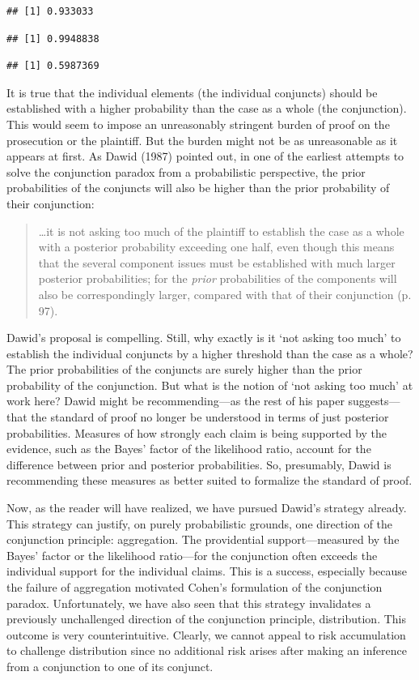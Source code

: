 \documentclass[
  10pt,
  dvipsnames,enabledeprecatedfontcommands]{scrartcl}
\begin{document}
\begin{verbatim}
## [1] 0.933033
\end{verbatim}

\begin{verbatim}
## [1] 0.9948838
\end{verbatim}

\begin{verbatim}
## [1] 0.5987369
\end{verbatim}

It is true that the individual elements (the individual conjuncts)
should be established with a higher probability than the case as a whole
(the conjunction). This would seem to impose an unreasonably stringent
burden of proof on the prosecution or the plaintiff. But the burden
might not be as unreasonable as it appears at first. As Dawid (1987)
pointed out, in one of the earliest attempts to solve the conjunction
paradox from a probabilistic perspective, the prior probabilities of the
conjuncts will also be higher than the prior probability of their
conjunction:

\begin{quote}
\dots it is not asking too much of the plaintiff to establish the case as a whole with a posterior probability exceeding one half, even though this means  that the several component issues must be established with much larger posterior probabilities; for the \textit{prior}  probabilities of the components will also be correspondingly larger, compared with that of their conjunction (p. 97).
 \end{quote}

Dawid's proposal is compelling. Still, why exactly is it `not asking too
much' to establish the individual conjuncts by a higher threshold than
the case as a whole? The prior probabilities of the conjuncts are surely
higher than the prior probability of the conjunction. But what is the
notion of `not asking too much' at work here? Dawid might be
recommending---as the rest of his paper suggests---that the standard of
proof no longer be understood in terms of just posterior probabilities.
Measures of how strongly each claim is being supported by the evidence,
such as the Bayes' factor of the likelihood ratio, account for the
difference between prior and posterior probabilities. So, presumably,
Dawid is recommending these measures as better suited to formalize the
standard of proof.

Now, as the reader will have realized, we have pursued Dawid's strategy
already. This strategy can justify, on purely probabilistic grounds, one
direction of the conjunction principle: aggregation. The providential
support---measured by the Bayes' factor or the likelihood ratio---for
the conjunction often exceeds the individual support for the individual
claims. This is a success, especially because the failure of aggregation
motivated Cohen's formulation of the conjunction paradox. Unfortunately,
we have also seen that this strategy invalidates a previously
unchallenged direction of the conjunction principle, distribution. This
outcome is very counterintuitive. Clearly, we cannot appeal to risk
accumulation to challenge distribution since no additional risk arises
after making an inference from a conjunction to one of its conjunct.
\end{document}
